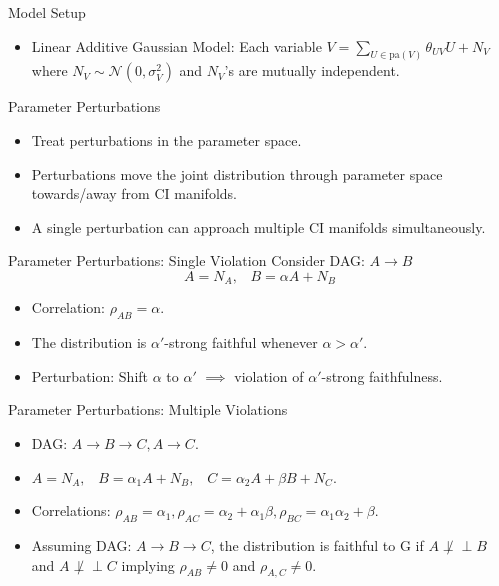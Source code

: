 \documentclass{beamer}
\def\ci{\perp\!\!\!\!\!\perp}
\begin{document}
\begin{frame}{Model Setup}
	\begin{itemize}
		\item Linear Additive Gaussian Model: Each variable $V = \sum_{U\in\text{pa}(V)} \theta_{UV}U + N_V$ where $N_V \sim \mathcal N(0,\sigma_V^2)$ and $N_V$’s are mutually independent.
	\end{itemize}
\end{frame}

\begin{frame}{Parameter Perturbations}
	\begin{itemize}
		\item Treat perturbations in the parameter space.
		\item Perturbations move the joint distribution through parameter space towards/away from CI manifolds.
		\item A single perturbation can approach multiple CI manifolds simultaneously.
	\end{itemize}
\end{frame}

\begin{frame}{Parameter Perturbations: Single Violation}
	Consider DAG: $ A \rightarrow B $
	$$ A = N_A, \;\;\; B = \alpha A + N_B $$
	\begin{itemize}
		\item Correlation: $ \rho_{AB} = \alpha $.
		\item The distribution is $ \alpha'$-strong faithful whenever $ \alpha > \alpha' $.
		\item Perturbation: Shift $ \alpha $ to $ \alpha' $ $ \implies $ violation of $ \alpha'$-strong faithfulness.
	\end{itemize}
\end{frame}

\begin{frame}{Parameter Perturbations: Multiple Violations}
	\begin{itemize}
		\item DAG: $ A \rightarrow B \rightarrow C, A \rightarrow C $.
		\item $ A = N_A, \;\;\; B = \alpha_1 A + N_B, \;\;\; C = \alpha_2 A + \beta B + N_C $.
		\item Correlations: $ \rho_{AB} = \alpha_1, \rho_{AC} = \alpha_2 + \alpha_1 \beta , \rho_{BC} = \alpha_1 \alpha_2 + \beta$.
		\item  Assuming DAG: $ A \rightarrow B \rightarrow C $, the distribution is faithful to G if $ A \not \ci B $ and $ A \not \ci C $ implying $ \rho_{AB} \ne 0 $ and $ \rho_{A,C} \ne 0 $.
	\end{itemize}	
\end{frame}
\end{document}

